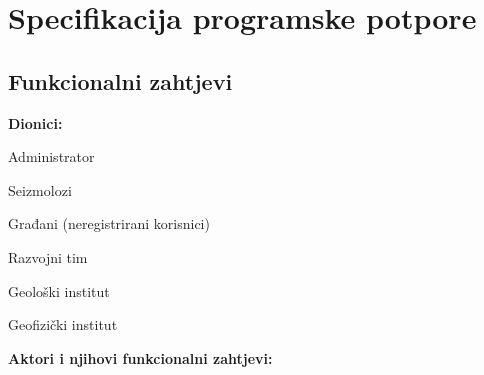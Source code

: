 \chapter{Specifikacija programske potpore}
		
	\section{Funkcionalni zahtjevi}
			
			\noindent \textbf{Dionici:}
			
			\begin{packed_enum}
				
				\item Administrator
				\item Seizmolozi
				\item Građani (neregistrirani korisnici)
				\item Razvojni tim
				\item Geološki institut
				\item Geofizički institut

			\end{packed_enum}
			
			\noindent \textbf{Aktori i njihovi funkcionalni zahtjevi:}
			
